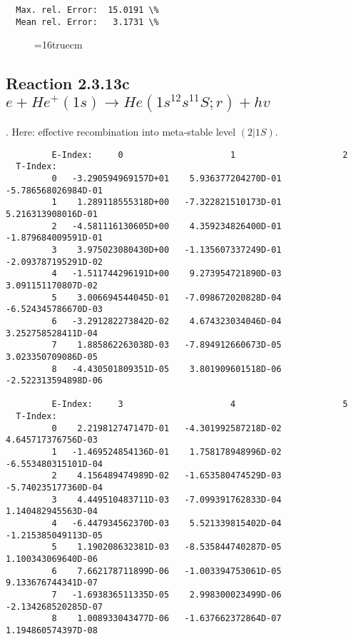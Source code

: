 \documentclass[12pt,dvipdfmx]{article}
\begin{document}
\begin{small}
\begin{verbatim}
  Max. rel. Error:  15.0191 \%
  Mean rel. Error:   3.1731 \%

\end{verbatim}\end{small}
\begin{figure} \label{2.3.13b}
\epsfxsize=16truecm
\end{figure}
\newpage

\subsection{
Reaction 2.3.13c $ e + He^+(1s) \rightarrow He(1s^12s^11S;r) + hv$
}

\cite{kn:Fujimoto}. Here: effective recombination into meta-stable level
$(2|1S)$.

\begin{small}\begin{verbatim}
         E-Index:     0                     1                     2
  T-Index:
         0   -3.290594969157D+01    5.936377204270D-01   -5.786568026984D-01
         1    1.289118555318D+00   -7.322821510173D-01    5.216313908016D-01
         2   -4.581116130605D+00    4.359234826400D-01   -1.879684009591D-01
         3    3.975023080430D+00   -1.135607337249D-01   -2.093787195291D-02
         4   -1.511744296191D+00    9.273954721890D-03    3.091151170807D-02
         5    3.006694544045D-01   -7.098672020828D-04   -6.524345786670D-03
         6   -3.291282273842D-02    4.674323034046D-04    3.252758528411D-04
         7    1.885862263038D-03   -7.894912660673D-05    3.023350709086D-05
         8   -4.430501809351D-05    3.801909601518D-06   -2.522313594898D-06

         E-Index:     3                     4                     5
  T-Index:
         0    2.219812747147D-01   -4.301992587218D-02    4.645717376756D-03
         1   -1.469524854136D-01    1.758178948996D-02   -6.553480315101D-04
         2    4.156489474989D-02   -1.653580474529D-03   -5.740235177360D-04
         3    4.449510483711D-03   -7.099391762833D-04    1.140482945563D-04
         4   -6.447934562370D-03    5.521339815402D-04   -1.215385049113D-05
         5    1.190208632381D-03   -8.535844740287D-05    1.100343069640D-06
         6    7.662178711899D-06   -1.003394753061D-05    9.133676744341D-07
         7   -1.693836511335D-05    2.998300023499D-06   -2.134268520285D-07
         8    1.008933043477D-06   -1.637662372864D-07    1.194860574397D-08


\end{verbatim}
\end{small}
\end{document}
